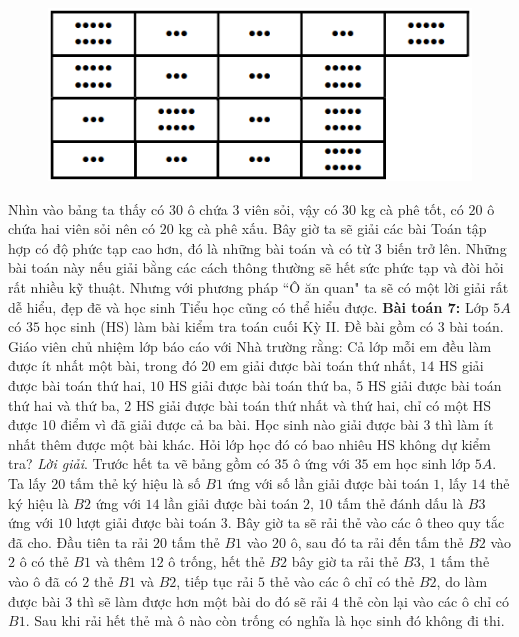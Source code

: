 \begin{multicols}{2}
	\begin{figure}[H]
		\vspace*{5pt}
		\centering
		\captionsetup{labelformat= empty, justification=centering}
		\includegraphics[width= 1\linewidth]{5}
		\vspace*{-15pt}
	\end{figure}
	Nhìn vào bảng ta thấy có $30$ ô chứa $3$ viên sỏi, vậy có $30$ kg cà phê tốt, có $20$ ô chứa hai viên sỏi nên có $20$ kg cà phê xấu.
	\vskip 0.1cm
	Bây giờ ta sẽ giải các bài Toán tập hợp có độ phức tạp cao hơn, đó là những bài toán và có từ $3$ biến trở lên. Những bài toán này nếu giải bằng các cách thông thường sẽ hết sức phức tạp và đòi hỏi rất nhiều kỹ thuật. Nhưng với phương pháp ``Ô ăn quan" ta sẽ có một lời giải rất dễ hiểu, đẹp đẽ và học sinh Tiểu học cũng có thể hiểu được.
	\vskip 0.1cm
	\textbf{\color{toancuabi}Bài toán $\pmb7$:}
	\vskip 0.1cm
	Lớp $5A$ có $35$ học sinh (HS) làm bài kiểm tra toán cuối Kỳ II. Đề bài gồm có $3$ bài toán. Giáo viên chủ nhiệm lớp báo cáo với Nhà trường rằng: Cả lớp mỗi em đều làm được ít nhất một bài, trong đó $20$ em giải được bài toán thứ nhất, $14$ HS giải được bài toán thứ hai, $10$ HS giải được bài toán thứ ba, $5$ HS giải được bài toán thứ hai và thứ ba, $2$ HS giải được bài toán thứ nhất và thứ hai, chỉ có một HS được $10$ điểm vì đã giải được cả ba bài. Học sinh nào giải được bài $3$ thì làm ít nhất thêm được một bài khác.
	Hỏi lớp học đó có bao nhiêu HS không dự kiểm tra?
	\vskip 0.1cm
	\textit{Lời giải}.
	Trước hết ta vẽ bảng gồm có $35$ ô ứng với $35$ em học sinh lớp $5A$. Ta lấy $20$ tấm thẻ ký hiệu là số $B1$ ứng với số lần giải được bài toán $1$, lấy $14$ thẻ ký hiệu là $B2$ ứng với $14$ lần giải được bài toán $2$, $10$ tấm thẻ đánh dấu là $B3$ ứng với $10$ lượt giải được bài toán $3$. Bây giờ ta sẽ rải thẻ vào các ô theo quy tắc đã cho. Đầu tiên ta rải $20$ tấm thẻ $B1$ vào $20$ ô, sau đó ta rải đến tấm thẻ $B2$ vào $2$ ô có thẻ $B1$ và thêm $12$ ô trống, hết thẻ $B2$ bây giờ ta rải thẻ $B3$, $1$ tấm thẻ vào ô đã có $2$ thẻ $B1$ và $B2$, tiếp tục rải $5$ thẻ vào các ô chỉ có thẻ $B2$, do làm được bài $3$ thì sẽ làm được hơn một bài do đó sẽ rải $4$ thẻ còn lại vào các ô chỉ có $B1$. Sau khi rải hết thẻ mà ô nào còn trống có nghĩa là học sinh đó không đi thi.

\end{multicols}
